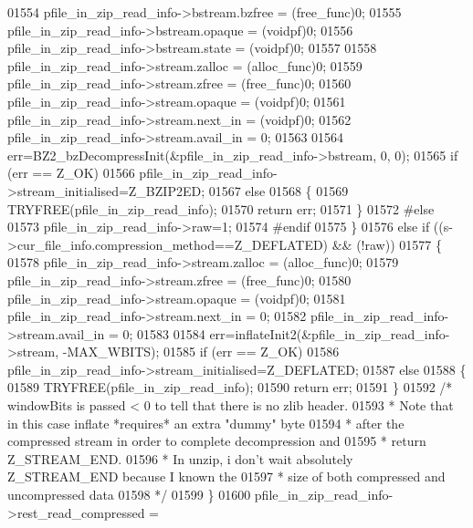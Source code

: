 \begin{DoxyCode}
01554       pfile\_in\_zip\_read\_info->bstream.bzfree = (free\_func)0;
01555       pfile\_in\_zip\_read\_info->bstream.opaque = (voidpf)0;
01556       pfile\_in\_zip\_read\_info->bstream.state = (voidpf)0;
01557 
01558       pfile\_in\_zip\_read\_info->stream.zalloc = (alloc\_func)0;
01559       pfile\_in\_zip\_read\_info->stream.zfree = (free\_func)0;
01560       pfile\_in\_zip\_read\_info->stream.opaque = (voidpf)0;
01561       pfile\_in\_zip\_read\_info->stream.next\_in = (voidpf)0;
01562       pfile\_in\_zip\_read\_info->stream.avail\_in = 0;
01563 
01564       err=BZ2\_bzDecompressInit(&pfile\_in\_zip\_read\_info->bstream, 0, 0);
01565       \textcolor{keywordflow}{if} (err == Z\_OK)
01566         pfile\_in\_zip\_read\_info->stream\_initialised=Z\_BZIP2ED;
01567       \textcolor{keywordflow}{else}
01568       \{
01569         TRYFREE(pfile\_in\_zip\_read\_info);
01570         \textcolor{keywordflow}{return} err;
01571       \}
01572 \textcolor{preprocessor}{#else}
01573       pfile\_in\_zip\_read\_info->raw=1;
01574 \textcolor{preprocessor}{#endif}
01575     \}
01576     \textcolor{keywordflow}{else} \textcolor{keywordflow}{if} ((s->cur\_file\_info.compression\_method==Z\_DEFLATED) && (!raw))
01577     \{
01578       pfile\_in\_zip\_read\_info->stream.zalloc = (alloc\_func)0;
01579       pfile\_in\_zip\_read\_info->stream.zfree = (free\_func)0;
01580       pfile\_in\_zip\_read\_info->stream.opaque = (voidpf)0;
01581       pfile\_in\_zip\_read\_info->stream.next\_in = 0;
01582       pfile\_in\_zip\_read\_info->stream.avail\_in = 0;
01583 
01584       err=inflateInit2(&pfile\_in\_zip\_read\_info->stream, -MAX\_WBITS);
01585       \textcolor{keywordflow}{if} (err == Z\_OK)
01586         pfile\_in\_zip\_read\_info->stream\_initialised=Z\_DEFLATED;
01587       \textcolor{keywordflow}{else}
01588       \{
01589         TRYFREE(pfile\_in\_zip\_read\_info);
01590         \textcolor{keywordflow}{return} err;
01591       \}
01592         \textcolor{comment}{/* windowBits is passed < 0 to tell that there is no zlib header.}
01593 \textcolor{comment}{         * Note that in this case inflate *requires* an extra "dummy" byte}
01594 \textcolor{comment}{         * after the compressed stream in order to complete decompression and}
01595 \textcolor{comment}{         * return Z\_STREAM\_END.}
01596 \textcolor{comment}{         * In unzip, i don't wait absolutely Z\_STREAM\_END because I known the}
01597 \textcolor{comment}{         * size of both compressed and uncompressed data}
01598 \textcolor{comment}{         */}
01599     \}
01600     pfile\_in\_zip\_read\_info->rest\_read\_compressed =

\end{DoxyCode}
